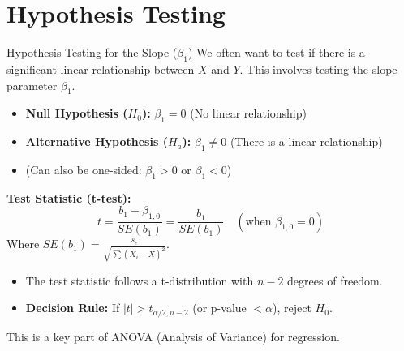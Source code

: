 \documentclass[aspectratio=169]{beamer}
\begin{document}
\section{Hypothesis Testing}
\begin{frame}{Hypothesis Testing for the Slope ($\beta_1$)}
  We often want to test if there is a significant linear relationship between $X$ and $Y$. This involves testing the slope parameter $\beta_1$.
  \begin{itemize}
    \item \textbf{Null Hypothesis ($H_0$):} $\beta_1 = 0$ (No linear relationship)
    \item \textbf{Alternative Hypothesis ($H_a$):} $\beta_1 \neq 0$ (There is a linear relationship)
    \item (Can also be one-sided: $\beta_1 > 0$ or $\beta_1 < 0$)
  \end{itemize}
  \textbf{Test Statistic (t-test):}
  \begin{equation*}
    t = \frac{b_1 - \beta_{1,0}}{SE(b_1)} = \frac{b_1}{SE(b_1)} \quad (\text{when } \beta_{1,0}=0)
  \end{equation*}
  Where $SE(b_1) = \frac{s_e}{\sqrt{\sum (X_i - \bar{X})^2}}$.
  \begin{itemize}
    \item The test statistic follows a t-distribution with $n-2$ degrees of freedom.
    \item \textbf{Decision Rule:} If $|t| > t_{\alpha/2, n-2}$ (or p-value $< \alpha$), reject $H_0$.
  \end{itemize}
  This is a key part of ANOVA (Analysis of Variance) for regression.
\end{frame}
\end{document}
